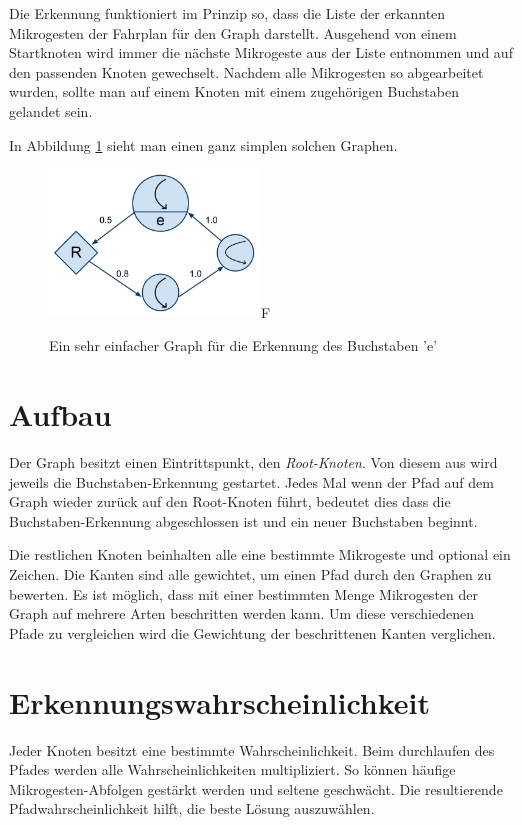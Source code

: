 Die Erkennung funktioniert im Prinzip so, dass die Liste der erkannten Mikrogesten der Fahrplan für den Graph darstellt. Ausgehend von einem Startknoten wird immer die nächste Mikrogeste aus der Liste entnommen und auf den passenden Knoten gewechselt. Nachdem alle Mikrogesten so abgearbeitet wurden, sollte man auf einem Knoten mit einem zugehörigen Buchstaben gelandet sein.

In Abbildung \ref{beispiel_graph} sieht man einen ganz simplen solchen Graphen. 

\begin{figure}[h!]
  \centering
    \includegraphics[width=0.5\textwidth]{./img/BeispielGraph.pdf}F
  \caption{Ein sehr einfacher Graph für die Erkennung des Buchstaben 'e'}
  \label{beispiel_graph}
\end{figure}

\section{Aufbau}
Der Graph besitzt einen Eintrittspunkt, den \emph{Root-Knoten}. Von diesem aus wird jeweils die Buchstaben-Erkennung gestartet. Jedes Mal wenn der Pfad auf dem Graph wieder zurück auf den Root-Knoten führt, bedeutet dies dass die Buchstaben-Erkennung abgeschlossen ist und ein neuer Buchstaben beginnt. 

Die restlichen Knoten beinhalten alle eine bestimmte Mikrogeste und optional ein Zeichen. Die Kanten sind alle gewichtet, um einen Pfad durch den Graphen zu bewerten. Es ist möglich, dass mit einer bestimmten Menge Mikrogesten der Graph auf mehrere Arten beschritten werden kann. Um diese verschiedenen Pfade zu vergleichen wird die Gewichtung der beschrittenen Kanten verglichen.

\section{Erkennungswahrscheinlichkeit}
Jeder Knoten besitzt eine bestimmte Wahrscheinlichkeit. Beim durchlaufen des Pfades werden alle Wahrscheinlichkeiten multipliziert. So können häufige Mikrogesten-Abfolgen gestärkt werden und seltene geschwächt. Die resultierende Pfadwahrscheinlichkeit hilft, die beste Lösung auszuwählen.

